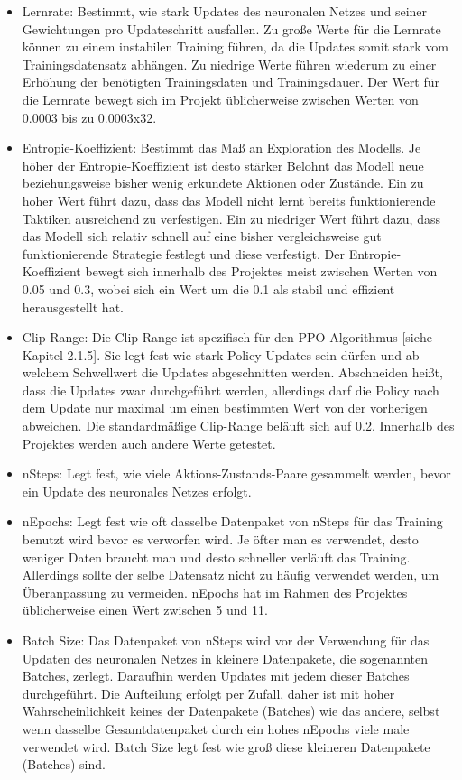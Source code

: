 \begin{itemize}
\item Lernrate: Bestimmt, wie stark Updates des neuronalen Netzes und seiner Gewichtungen pro Updateschritt ausfallen. Zu große Werte für die Lernrate können zu einem instabilen Training führen, da die Updates somit stark vom Trainingsdatensatz abhängen. Zu niedrige Werte führen wiederum zu einer Erhöhung der benötigten Trainingsdaten und Trainingsdauer. Der Wert für die Lernrate bewegt sich im Projekt üblicherweise zwischen Werten von 0.0003 bis zu 0.0003x32.

\item Entropie-Koeffizient: Bestimmt das Maß an Exploration des Modells. Je höher der Entropie-Koeffizient ist desto stärker Belohnt das Modell neue beziehungsweise bisher wenig erkundete Aktionen oder Zustände. Ein zu hoher Wert führt dazu, dass das Modell nicht lernt bereits funktionierende Taktiken ausreichend zu verfestigen. Ein zu niedriger Wert führt dazu, dass das Modell sich relativ schnell auf eine bisher vergleichsweise gut funktionierende Strategie festlegt und diese verfestigt. Der Entropie-Koeffizient bewegt sich innerhalb des Projektes meist zwischen Werten von 0.05 und 0.3, wobei sich ein Wert um die 0.1 als stabil und effizient herausgestellt hat.

\item Clip-Range: Die Clip-Range ist spezifisch für den PPO-Algorithmus [siehe Kapitel 2.1.5]. Sie legt fest wie stark Policy Updates sein dürfen und ab welchem Schwellwert die Updates abgeschnitten werden. Abschneiden heißt, dass die Updates zwar durchgeführt werden, allerdings darf die Policy nach dem Update nur maximal um einen bestimmten Wert von der vorherigen abweichen. Die standardmäßige Clip-Range beläuft sich auf 0.2. Innerhalb des Projektes werden auch andere Werte getestet.

\item nSteps: Legt fest, wie viele Aktions-Zustands-Paare gesammelt werden, bevor ein Update des neuronales Netzes erfolgt.

\item nEpochs: Legt fest wie oft dasselbe Datenpaket von nSteps für das Training benutzt wird bevor es verworfen wird. Je öfter man es verwendet, desto weniger Daten braucht man und desto schneller verläuft das Training. Allerdings sollte der selbe Datensatz nicht zu häufig verwendet werden, um Überanpassung zu vermeiden. nEpochs hat im Rahmen des Projektes üblicherweise einen Wert zwischen 5 und 11.

\item Batch Size: Das Datenpaket von nSteps wird vor der Verwendung für das Updaten des neuronalen Netzes in kleinere Datenpakete, die sogenannten Batches, zerlegt. Daraufhin werden Updates mit jedem dieser Batches durchgeführt. Die Aufteilung erfolgt per Zufall, daher ist mit hoher Wahrscheinlichkeit keines der Datenpakete (Batches) wie das andere, selbst wenn dasselbe Gesamtdatenpaket durch ein hohes nEpochs viele male verwendet wird. Batch Size legt fest wie groß diese kleineren Datenpakete (Batches) sind.


\end{itemize}
